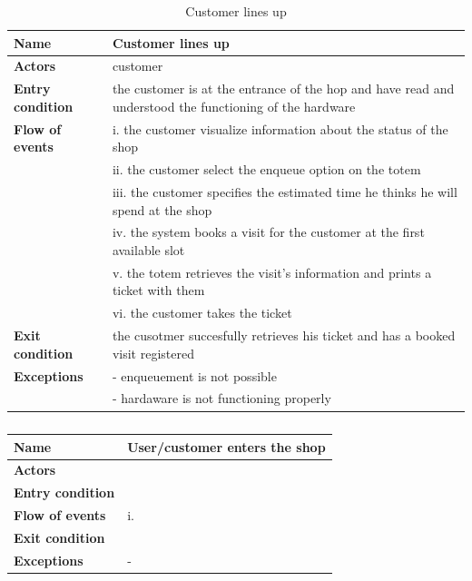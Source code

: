 \begin{table}[h!]
    \centering
    \begin{tabular}{@{}P{0.2\textwidth}P{0.70\textwidth}@{}}
        \toprule
        \textbf{Name}                 & Customer lines up\\
        \midrule
        \textbf{Actors}               & customer\\
        \textbf{Entry condition}      & the customer is at the entrance of the hop and have read and understood the functioning of the hardware\\
        \textbf{Flow of events}            
        & i. the customer visualize information about the status of the shop\\
        & ii. the customer select the enqueue option on the totem\\
        & iii. the customer specifies the estimated time he thinks he will spend at the shop\\
        & iv. the system books a visit for the customer at the first available slot\\
        & v. the totem retrieves the visit's information and prints a ticket with them\\
        & vi. the customer takes the ticket\\
        \textbf{Exit condition}       & the cusotmer succesfully retrieves his ticket and has a booked visit registered\\
        \textbf{Exceptions}           
        & - enqueuement is not possible\\
        & - hardaware is not functioning properly\\
        \bottomrule
    \end{tabular}
\caption{Customer lines up}
\label{table:customerlinesup}
\end{table}

\begin{table}[h!]
    \centering
    \begin{tabular}{@{}P{0.2\textwidth}P{0.70\textwidth}@{}}
        \toprule
        \textbf{Name}                 & User/customer enters the shop\\
        \midrule
        \textbf{Actors}               & \\
        \textbf{Entry condition}      & \\
        \textbf{Flow of events}            
        & i.\\
        \textbf{Exit condition}       & \\
        \textbf{Exceptions}           
        & - \\
        \bottomrule
    \end{tabular}
\caption{}
\label{table:entershop}
\end{table}

